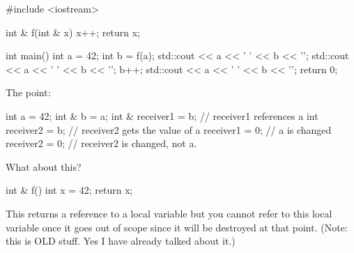 \begin{consolethree}[escapeinside=||]
#include <iostream>

int & f(int & x)
{
    x++;
    return x;
}

int main()
{
    int a = 42;
    int b = f(a);
    std::cout << a << ' ' << b << '\n';
    std::cout << a << ' ' << b << '\n';
    b++;
    std::cout << a << ' ' << b << '\n';
    return 0;
}
\end{consolethree}

The point:

\begin{consolethree}[escapeinside=||]
int a = 42;
int & b = a;
int & receiver1 = b;  // receiver1 references a
int receiver2 = b;    // receiver2 gets the value of a
receiver1 = 0;        // a is changed
receiver2 = 0;        // receiver2 is changed, not a.
\end{consolethree}

What about this?

\begin{consolethree}[escapeinside=||]
int & f()
{
    int x = 42;
    return x;
}
\end{consolethree}

This returns a reference to a local variable but you cannot refer to
this local variable once it goes out of scope since it will be destroyed
at that point. (Note: this is OLD stuff. Yes I have already talked about
it.)



